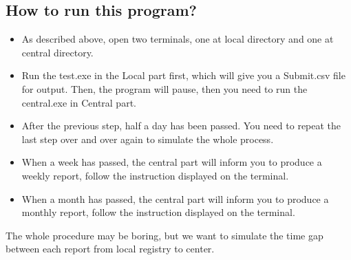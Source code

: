 \documentclass{article}
\begin{document}
\subsection*{How to run this program?}
    \begin{itemize}
        \item As described above, open two terminals, one at local directory and one at central directory.
        \item Run the test.exe in the Local part first, which will give you a Submit.csv file for output. Then, 
              the program will pause, then you need to run the central.exe in Central part.
        \item After the previous step, half a day has been passed. You need to repeat the last step over and over again 
              to simulate the whole process.
        \item When a week has passed, the central part will inform you to produce a weekly report, follow the instruction
              displayed on the terminal.
        \item When a month has passed, the central part will inform you to produce a monthly report, follow the instruction
              displayed on the terminal.
    \end{itemize}
    The whole procedure may be boring, but we want to simulate the time gap between each report from local registry to center.
\end{document}
